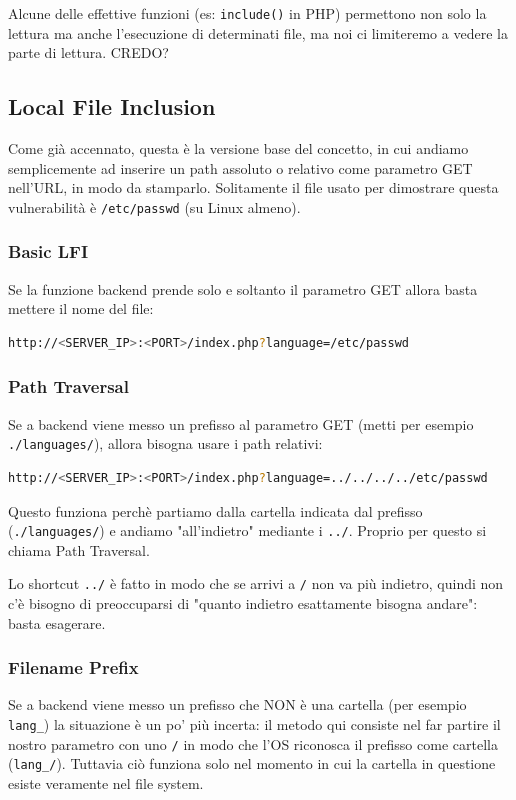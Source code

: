 \documentclass[12pt,a4paper]{report}
\begin{document}
	\begin{nota}
		Alcune delle effettive funzioni (es: \texttt{include()} in PHP) permettono non solo la lettura ma anche l'esecuzione di determinati file, ma noi ci limiteremo a vedere la parte di lettura. CREDO?
	\end{nota}
	
	\subsection{Local File Inclusion}
	Come già accennato, questa è la versione base del concetto, in cui andiamo semplicemente ad inserire un path assoluto o relativo come parametro GET nell'URL, in modo da stamparlo. Solitamente il file usato per dimostrare questa vulnerabilità è \texttt{/etc/passwd} (su Linux almeno).
	
	\subsubsection{Basic LFI}
	Se la funzione backend prende solo e soltanto il parametro GET allora basta mettere il nome del file:
	\begin{lstlisting}[language=bash]
		http://<SERVER_IP>:<PORT>/index.php?language=/etc/passwd
	\end{lstlisting}
	
	\subsubsection{Path Traversal}
	Se a backend viene messo un prefisso al parametro GET (metti per esempio \texttt{./languages/}), allora bisogna usare i path relativi:
	\begin{lstlisting}[language=bash]
		http://<SERVER_IP>:<PORT>/index.php?language=../../../../etc/passwd
	\end{lstlisting}
	Questo funziona perchè partiamo dalla cartella indicata dal prefisso (\texttt{./languages/}) e andiamo "all'indietro" mediante i \texttt{../}. Proprio per questo si chiama Path Traversal.
	
	\begin{nota}
		Lo shortcut \texttt{../} è fatto in modo che se arrivi a \texttt{/} non va più indietro, quindi non c'è bisogno di preoccuparsi di "quanto indietro esattamente bisogna andare": basta esagerare.
	\end{nota}
	
	\subsubsection{Filename Prefix}
	Se a backend viene messo un prefisso che NON è una cartella (per esempio \texttt{lang\_}) la situazione è un po' più incerta: il metodo qui consiste nel far partire il nostro parametro con uno \texttt{/} in modo che l'OS riconosca il prefisso come cartella (\texttt{lang\_/}). Tuttavia ciò funziona solo nel momento in cui la cartella in questione esiste veramente nel file system.
	
\end{document}
